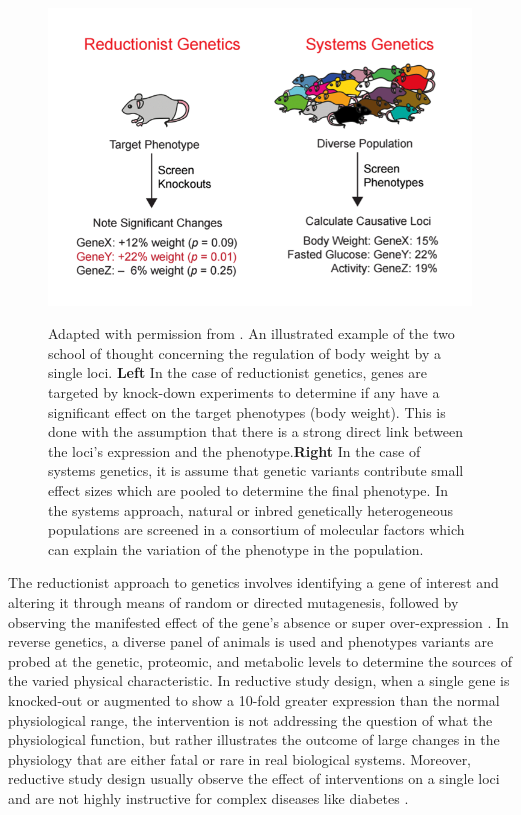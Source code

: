 \documentclass[a4paper,11pt,twoside]{book}
\begin{document}
	\begin{figure}[ht]
		\centering
		\includegraphics[width=\linewidth]{1.Introduction_Figures/Reductionnist_genetics.PNG}
		\label{Reductionist vs. Systems Genetics}
		\caption{Adapted with permission from \citep{Williams2014Thesis}. An illustrated example of the two school of thought concerning the regulation of body weight by a single loci. \textbf{Left} In the case of reductionist genetics, genes are targeted by knock-down experiments to determine if any have a significant effect on the target phenotypes (body weight). This is done with the assumption that there is a strong direct link between the loci's expression and the phenotype.\textbf{Right} In the case of systems genetics, it is assume that genetic variants contribute small effect sizes which are pooled to determine the final phenotype. In the systems approach, natural or inbred genetically heterogeneous populations are screened in a consortium of molecular factors which can explain the variation of the phenotype in the population.}
	\end{figure}
	
	The reductionist approach to genetics involves identifying a gene of interest and altering it through means of random or directed mutagenesis, followed by observing the manifested effect of the gene's absence or super over-expression \citep{Williams2015TheAnalysis}. In reverse genetics, a diverse panel of animals is used and phenotypes variants are probed at the genetic, proteomic, and metabolic levels to determine the sources of the varied physical characteristic. In reductive study design, when a single gene is knocked-out or augmented to show a 10-fold greater expression than the normal physiological range, the intervention is not addressing the question of what the physiological function, but rather illustrates the outcome of large changes in the physiology that are either fatal or rare in real biological systems. Moreover, reductive study design usually observe the effect of interventions on a single  loci and are not highly instructive for complex diseases like diabetes \citep{Williams2015TheAnalysis}.
	
\end{document}
